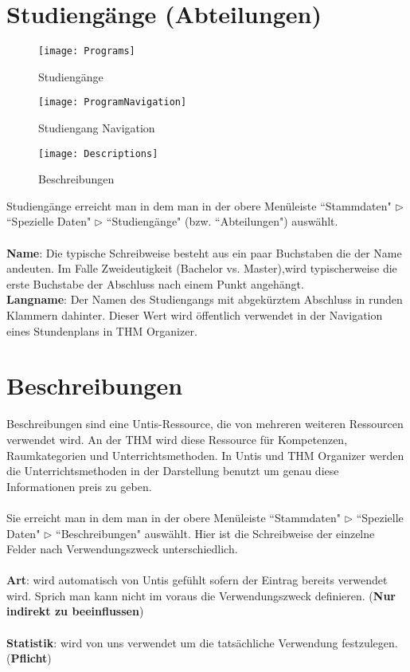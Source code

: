\documentclass[]{report}
\begin{document}
\newpage
\section{Studiengänge (Abteilungen)}

\begin{wrapfigure}{r}{0.4\textwidth}
	\vspace{-14pt}
	\texttt{[image: Programs]}
	\vspace{-5pt}
	\caption{Studiengänge}
	\label{fig:programs}
	\vspace{24pt}
	\texttt{[image: ProgramNavigation]}
	\vspace{-5pt}
	\caption{Studiengang Navigation}
	\label{fig:program-navigation}
	\vspace{24pt}
	\texttt{[image: Descriptions]}
	\vspace{-15pt}
	\caption{Beschreibungen}
	\label{fig:descriptions}
	\vspace{-45pt}
\end{wrapfigure}

Studiengänge erreicht man in dem man in der obere Menüleiste ``Stammdaten" $\triangleright$ ``Spezielle Daten" $\triangleright$ ``Studiengänge" (bzw. ``Abteilungen") auswählt.\\
\\
\textbf{Name}: Die typische Schreibweise besteht aus ein paar Buchstaben die der Name andeuten. Im Falle Zweideutigkeit (Bachelor vs. Master),wird typischerweise die erste Buchstabe der Abschluss nach einem Punkt angehängt.\\

\noindent
\textbf{Langname}: Der Namen des Studiengangs mit abgekürztem Abschluss in runden Klammern dahinter. Dieser Wert wird öffentlich verwendet in der Navigation eines Stundenplans in THM Organizer.

\section{Beschreibungen}

Beschreibungen sind eine Untis-Ressource, die von mehreren weiteren Ressourcen verwendet wird. An der THM wird diese Ressource für Kompetenzen, Raumkategorien und Unterrichtsmethoden. In Untis und THM Organizer werden die Unterrichtsmethoden in der Darstellung benutzt um genau diese Informationen preis zu geben.\\
\\
Sie erreicht man in dem man in der obere Menüleiste ``Stammdaten" $\triangleright$ ``Spezielle Daten" $\triangleright$ ``Beschreibungen" auswählt. Hier ist die Schreibweise der einzelne Felder nach Verwendungszweck unterschiedlich.\\
\\
\textbf{Art}: wird automatisch von Untis gefühlt sofern der Eintrag bereits verwendet wird. Sprich man kann nicht im voraus die Verwendungszweck definieren. (\textbf{Nur indirekt zu beeinflussen})\\
\\
\textbf{Statistik}: wird von uns verwendet um die tatsächliche Verwendung festzulegen. (\textbf{Pflicht})
\end{document}
